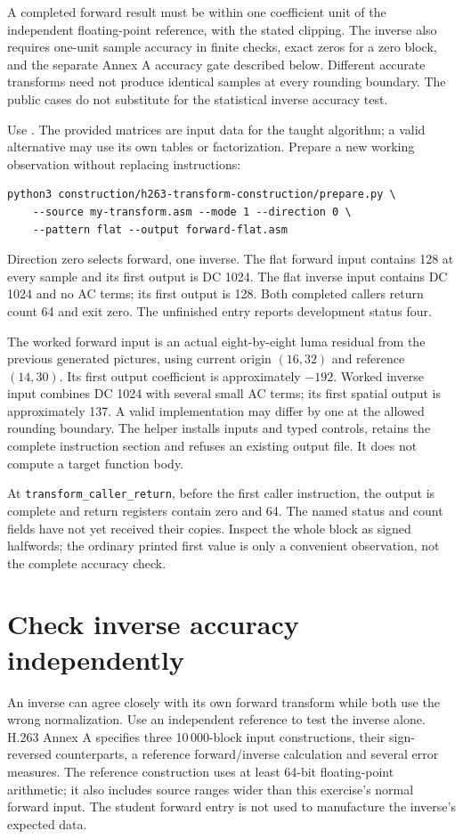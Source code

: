 A completed forward result must be within one coefficient unit of the independent
floating-point reference, with the stated clipping. The inverse also requires
one-unit sample accuracy in finite checks, exact zeros for a zero block, and the
separate Annex A accuracy gate described below. Different accurate transforms
need not produce identical samples at every rounding boundary. The public cases
do not substitute for the statistical inverse accuracy test.

Use . The provided matrices are
input data for the taught algorithm; a valid alternative may use its own tables
or factorization. Prepare a new working observation without replacing instructions:
\begin{verbatim}
python3 construction/h263-transform-construction/prepare.py \
    --source my-transform.asm --mode 1 --direction 0 \
    --pattern flat --output forward-flat.asm
\end{verbatim}
Direction zero selects forward, one inverse. The flat forward input contains 128
at every sample and its first output is DC 1024. The flat inverse input contains
DC 1024 and no AC terms; its first output is 128. Both completed callers return
count 64 and exit zero. The unfinished entry reports development status four.

The worked forward input is an actual eight-by-eight luma residual from the
previous generated pictures, using current origin $(16,32)$ and reference
$(14,30)$. Its first output coefficient is approximately $-192$.
Worked inverse input combines DC 1024 with several small AC terms; its first
spatial output is approximately 137. A valid implementation may differ by one
at the allowed rounding boundary. The helper installs inputs and typed controls,
retains the complete instruction section and refuses an existing output file.
It does not compute a target function body.

At \texttt{transform\_caller\_return}, before the first caller instruction,
the output is complete and return registers contain zero and 64. The named
status and count fields have not yet received their copies. Inspect the whole
block as signed halfwords; the ordinary printed first value is only a convenient
observation, not the complete accuracy check.

\section{Check inverse accuracy independently}
An inverse can agree closely with its own forward transform while both use the
wrong normalization. Use an independent reference to test the inverse alone.
H.263 Annex A specifies three 10\,000-block input constructions, their sign-reversed
counterparts, a reference forward/inverse calculation and several error measures.
The reference construction uses at least 64-bit floating-point arithmetic; it
also includes source ranges wider than this exercise's normal forward input.
The student forward entry is not used to manufacture the inverse's expected data.

